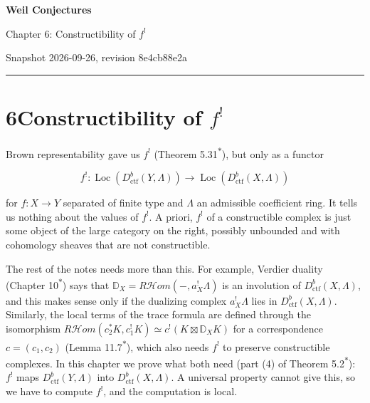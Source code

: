 \documentclass[11pt]{article}
\newcommand{\bpout}[1]{#1\textsuperscript{\hyperlink{bp-outside}{\ensuremath{\ast}}}}
\providecommand{\Loc}{}\renewcommand{\Loc}{\operatorname{Loc}}
\providecommand{\cHom}{}\renewcommand{\cHom}{R\mathcal{H}\!om}
\begin{document}
\pagestyle{plain}
\begin{center}
{\LARGE\bfseries Weil Conjectures\par}
\vspace{0.7em}
{\large Chapter 6: Constructibility of $f^!$\par}
\vspace{0.5em}
{\small\color{bpmuted}Snapshot 2026-09-26, revision 8e4cb88e2a\par}
\end{center}
\vspace{0.5em}
{\small\tableofcontents}
\bigskip\hrule\bigskip

\section*{\texorpdfstring{6\quad Constructibility of $f^!$}{6 Constructibility of f!}}
\label{bp1}%
\label{bp2}%
Brown representability gave us \(f^!\) (Theorem \bpout{5.31}), but only as a functor

\[
f^!:\Loc(D^b_{\mathrm{ctf}}(Y,\Lambda))\longrightarrow\Loc(D^b_{\mathrm{ctf}}(X,\Lambda))
\]

for \(f:X\to Y\) separated of finite type and \(\Lambda\) an admissible coefficient ring. It tells us nothing about the values of \(f^!\). A priori, \(f^!\) of a constructible complex is just some object of the large category on the right, possibly unbounded and with cohomology sheaves that are not constructible.

The rest of the notes needs more than this. For example, Verdier duality (Chapter \bpout{10}) says that \(\mathbb D_X=\cHom(-,a_X^!\Lambda)\) is an involution of \(D^b_{\mathrm{ctf}}(X,\Lambda)\), and this makes sense only if the dualizing complex \(a_X^!\Lambda\) lies in \(D^b_{\mathrm{ctf}}(X,\Lambda)\). Similarly, the local terms of the trace formula are defined through the isomorphism \(\cHom(c_2^*K,c_1^!K)\simeq c^!(K\boxtimes\mathbb D_XK)\) for a correspondence \(c=(c_1,c_2)\) (Lemma \bpout{11.7}), which also needs \(f^!\) to preserve constructible complexes. In this chapter we prove what both need (part (4) of Theorem \bpout{5.2}): \(f^!\) maps \(D^b_{\mathrm{ctf}}(Y,\Lambda)\) into \(D^b_{\mathrm{ctf}}(X,\Lambda)\). A universal property cannot give this, so we have to compute \(f^!\), and the computation is local.
\end{document}
